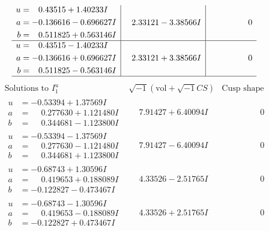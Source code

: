 \documentclass[1p]{elsarticle_modified}
\theoremstyle{definition}
\newcommand{\I}{\sqrt{-1}}
\begin{document}
$$\begin{array}{c|c|c}
\begin{aligned}
u &= \phantom{-}0.43515 + 1.40233 I \\
a &= -0.136616 - 0.696627 I \\
b &= \phantom{-}0.511825 + 0.563146 I\end{aligned}
 & \phantom{-}2.33121 - 3.38566 I & \phantom{-0.000000 } 0 \\ \hline\begin{aligned}
u &= \phantom{-}0.43515 - 1.40233 I \\
a &= -0.136616 + 0.696627 I \\
b &= \phantom{-}0.511825 - 0.563146 I\end{aligned}
 & \phantom{-}2.33121 + 3.38566 I & \phantom{-0.000000 } 0\\
 \hline 
 \end{array}$$\newpage$$\begin{array}{c|c|c}  
\text{Solutions to }I^u_{1}& \I (\text{vol} + \sqrt{-1}CS) & \text{Cusp shape}\\
 \hline 
\begin{aligned}
u &= -0.53394 + 1.37569 I \\
a &= \phantom{-}0.277630 + 1.121480 I \\
b &= \phantom{-}0.344681 - 1.123800 I\end{aligned}
 & \phantom{-}7.91427 + 6.40094 I & \phantom{-0.000000 } 0 \\ \hline\begin{aligned}
u &= -0.53394 - 1.37569 I \\
a &= \phantom{-}0.277630 - 1.121480 I \\
b &= \phantom{-}0.344681 + 1.123800 I\end{aligned}
 & \phantom{-}7.91427 - 6.40094 I & \phantom{-0.000000 } 0 \\ \hline\begin{aligned}
u &= -0.68743 + 1.30596 I \\
a &= \phantom{-}0.419653 + 0.188089 I \\
b &= -0.122827 - 0.473467 I\end{aligned}
 & \phantom{-}4.33526 - 2.51765 I & \phantom{-0.000000 } 0 \\ \hline\begin{aligned}
u &= -0.68743 - 1.30596 I \\
a &= \phantom{-}0.419653 - 0.188089 I \\
b &= -0.122827 + 0.473467 I\end{aligned}
 & \phantom{-}4.33526 + 2.51765 I & \phantom{-0.000000 } 0 \\ \hline\begin{aligned}

\end{aligned}
\end{array}$$
\end{document}
